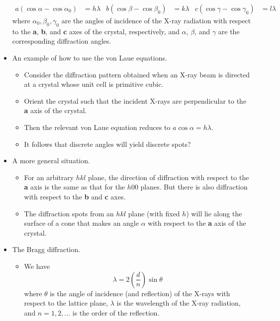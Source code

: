 \documentclass[../notes.tex]{subfiles}
\begin{document}
\begin{itemize}
    \begin{align*}
        a(\cos\alpha-\cos\alpha_0) &= h\lambda&
        b(\cos\beta-\cos\beta_0) &= k\lambda&
        c(\cos\gamma-\cos\gamma_0) &= l\lambda
    \end{align*}
    where $\alpha_0,\beta_0,\gamma_0$ are the angles of incidence of the X-ray radiation with respect to the \textbf{a}, \textbf{b}, and \textbf{c} axes of the crystal, respectively, and $\alpha$, $\beta$, and $\gamma$ are the corresponding diffraction angles.
    \item An example of how to use the von Laue equations.
    \begin{itemize}
        \item Consider the diffraction pattern obtained when an X-ray beam is directed at a crystal whose unit cell is primitive cubic.
        \item Orient the crystal such that the incident X-rays are perpendicular to the \textbf{a} axis of the crystal.
        \item Then the relevant von Laue equation reduces to $a\cos\alpha=h\lambda$.
        \item It follows that discrete angles will yield discrete spots?
    \end{itemize}
    \item A more general situation.
    \begin{itemize}
        \item For an arbitrary $hkl$ plane, the direction of diffraction with respect to the \textbf{a} axis is the same as that for the $h00$ planes. But there is also diffraction with respect to the \textbf{b} and \textbf{c} axes.
        \item The diffraction spots from an $hkl$ plane (with fixed $h$) will lie along the surface of a cone that makes an angle $\alpha$ with respect to the \textbf{a} axis of the crystal.
    \end{itemize}
    \item The Bragg diffraction.
    \begin{itemize}
        \item We have
        \begin{equation*}
            \lambda=2\left( \frac{d}{n} \right)\sin\theta
        \end{equation*}
        where $\theta$ is the angle of incidence (and reflection) of the X-rays with respect to the lattice plane, $\lambda$ is the wavelength of the X-ray radiation, and $n=1,2,\dots$ is the order of the reflection.

\end{itemize}
\end{itemize}
\end{document}
